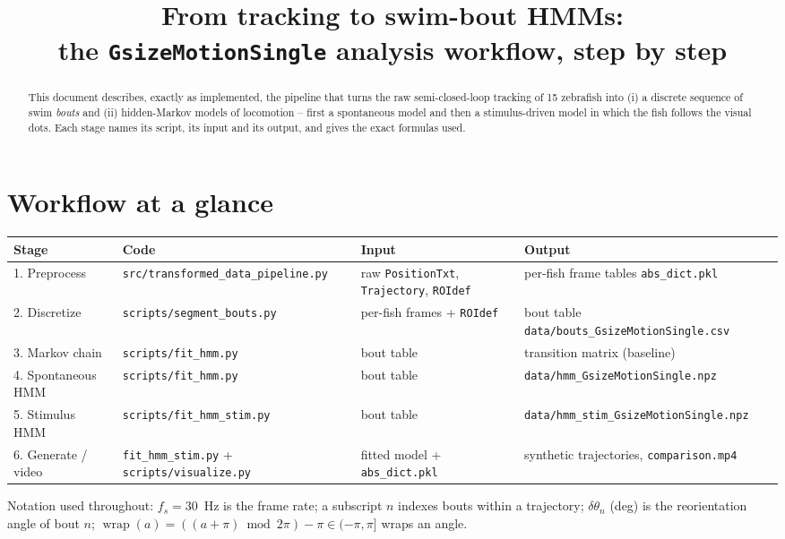 \documentclass[11pt]{article}
\title{From tracking to swim-bout HMMs:\\
       the \texttt{GsizeMotionSingle} analysis workflow, step by step}
\author{}
\date{}
\begin{document}
\maketitle

\begin{abstract}
\noindent
This document describes, exactly as implemented, the pipeline that turns the raw
semi-closed-loop tracking of 15 zebrafish into (i) a discrete sequence of swim
\emph{bouts} and (ii) hidden-Markov models of locomotion -- first a spontaneous
model and then a stimulus-driven model in which the fish follows the visual
dots. Each stage names its script, its input and its output, and gives the exact
formulas used.
\end{abstract}

\section*{Workflow at a glance}
\begin{table}[h]\centering\small
\begin{tabular}{@{}p{2.9cm}p{3.6cm}p{3.4cm}p{3.4cm}@{}}
\toprule
\textbf{Stage} & \textbf{Code} & \textbf{Input} & \textbf{Output}\\
\midrule
1. Preprocess & \texttt{src/transformed\_data\_pipeline.py} & raw
  \texttt{PositionTxt}, \texttt{Trajectory}, \texttt{ROIdef} & per-fish frame
  tables \texttt{abs\_dict.pkl}\\
2. Discretize & \texttt{scripts/segment\_bouts.py} & per-fish frames +
  \texttt{ROIdef} & bout table \texttt{data/bouts\_GsizeMotionSingle.csv}\\
3. Markov chain & \texttt{scripts/fit\_hmm.py} & bout table &
  transition matrix (baseline)\\
4. Spontaneous HMM & \texttt{scripts/fit\_hmm.py} & bout table &
  \texttt{data/hmm\_GsizeMotionSingle.npz}\\
5. Stimulus HMM & \texttt{scripts/fit\_hmm\_stim.py} & bout table &
  \texttt{data/hmm\_stim\_GsizeMotionSingle.npz}\\
6. Generate / video & \texttt{fit\_hmm\_stim.py} + \texttt{scripts/visualize.py}
  & fitted model + \texttt{abs\_dict.pkl} & synthetic trajectories,
  \texttt{comparison.mp4}\\
\bottomrule
\end{tabular}
\end{table}

Notation used throughout: $f_s=30$~Hz is the frame rate; a subscript $n$ indexes
bouts within a trajectory; $\delta\theta_n$ (deg) is the reorientation angle of
bout $n$; $\operatorname{wrap}(a)=((a+\pi)\bmod 2\pi)-\pi\in(-\pi,\pi]$ wraps an
angle.
\end{document}
